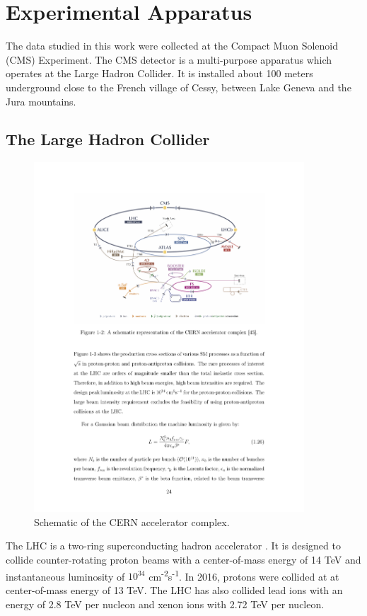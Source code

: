\chapter{Experimental Apparatus}

The data studied in this work were collected at the Compact Muon Solenoid (CMS) Experiment.
The CMS detector is a multi-purpose apparatus which operates at the Large Hadron Collider. 
It is installed about 100 meters underground close to the French village of Cessy,
between Lake Geneva and the Jura mountains.


\section{The Large Hadron Collider}

\begin{figure}[hb]
\centering
\includegraphics[width=0.9\textwidth]{figures/lhc_protons.pdf}
\caption{Schematic of the CERN accelerator complex.}
\label{fig:lhc}
\end{figure}

The LHC is a two-ring superconducting hadron accelerator \cite{lhcmachine}.
It is designed to collide counter-rotating proton beams with a center-of-mass energy of 14 TeV
and instantaneous luminosity of $10^{34}$ cm\textsuperscript{-2}s\textsuperscript{-1}.
In 2016, protons were collided at at center-of-mass energy of 13 TeV. 
The LHC has also collided lead ions with an energy of 2.8 TeV per nucleon and xenon ions with 2.72 TeV per nucleon.

